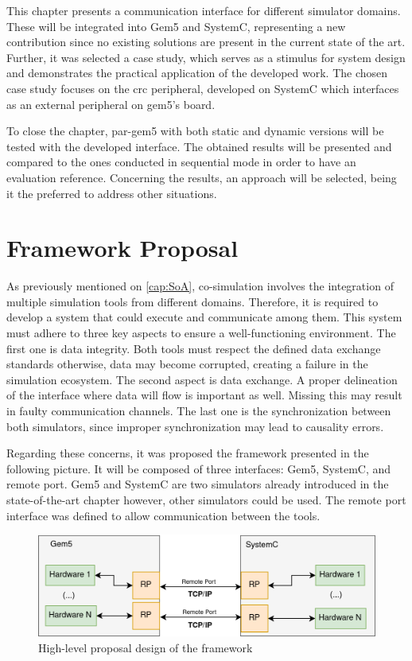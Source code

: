 
This chapter presents a communication interface for different simulator domains. These will be integrated into Gem5 and SystemC, representing 
a new contribution since no existing solutions are present in the current state of the art. Further, it was selected a 
case study, which serves as a stimulus for system design and demonstrates 
the practical application of the developed work. The chosen case study focuses on the \gls{crc} peripheral, developed on SystemC which interfaces 
as an external peripheral on gem5's board. 

To close the chapter, par-gem5 with both static and dynamic versions will be tested with the developed interface. 
The obtained results will be presented and compared to the ones conducted in sequential mode in order to have an evaluation reference. 
Concerning the results, an approach will be selected, being it the preferred to address other situations. 

\section{Framework Proposal}

As previously mentioned on \autoref{cap:SoA}, co-simulation involves the integration of multiple simulation tools from different
domains. Therefore, it is required to develop a system that could execute and communicate among them. This system must adhere to three key 
aspects to ensure a well-functioning environment. The first one is data integrity. Both tools must respect the defined data exchange standards 
otherwise, data may become corrupted, creating a failure in the simulation ecosystem. The second aspect is data exchange. A proper delineation of the 
interface where data will flow is important as well. Missing this may result in faulty communication channels. The last one is the synchronization 
between both simulators, since improper synchronization may lead to causality errors.

Regarding these concerns, it was proposed the framework presented in the following picture. It will be composed of three interfaces: Gem5, SystemC, 
and remote port. Gem5 and SystemC are two simulators already introduced in the state-of-the-art chapter however, other simulators could be used. 
The remote port interface was defined to allow communication between the tools.

\begin{figure}[H]
	\centering
 	\includegraphics[width=0.8\linewidth]{Images/CoSimDesignSimplified.png}
 	\caption{High-level proposal design of the framework}
	 \label{fig_CoSimDesignSimplified}
\end{figure}

